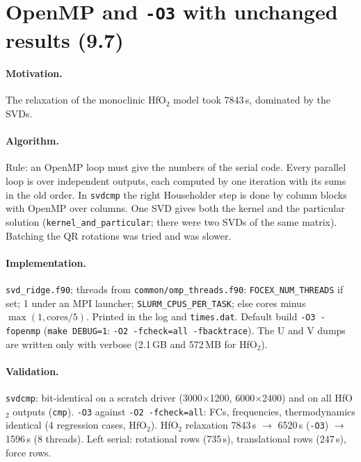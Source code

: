 \documentclass[11pt,a4paper]{article}
\newcommand{\code}[1]{\texttt{#1}}
\begin{document}
\section{\texorpdfstring{OpenMP and \code{-O3} with unchanged results (9.7)}{OpenMP and -O3 with unchanged results (9.7)}}
\paragraph{Motivation.} The relaxation of the monoclinic HfO$_2$ model took 7843\,s, dominated by the SVDs.

\paragraph{Algorithm.} Rule: an OpenMP loop must give the numbers of the serial code. Every parallel loop is
over independent outputs, each computed by one iteration with its sums in the old order. In \code{svdcmp}
the right Householder step is done by column blocks with OpenMP over columns. One SVD gives both the kernel
and the particular solution (\code{kernel\_and\_particular}; there were two SVDs of the same matrix). Batching
the QR rotations was tried and was slower.

\paragraph{Implementation.} \code{svd\_ridge.f90}; threads from \code{common/omp\_threads.f90}:
\code{FOCEX\_NUM\_THREADS} if set; 1 under an MPI launcher; \code{SLURM\_CPUS\_PER\_TASK}; else cores minus
$\max(1,\text{cores}/5)$. Printed in the log and \code{times.dat}. Default build \code{-O3 -fopenmp}
(\code{make DEBUG=1}: \code{-O2 -fcheck=all -fbacktrace}). The U and V dumps are written only with verbose
(2.1\,GB and 572\,MB for HfO$_2$).

\paragraph{Validation.} \code{svdcmp}: bit-identical on a scratch driver (3000$\times$1200, 6000$\times$2400) and on all
HfO$_2$ outputs (\code{cmp}). \code{-O3} against \code{-O2 -fcheck=all}: FCs, frequencies, thermodynamics identical
(4 regression cases, HfO$_2$). HfO$_2$ relaxation 7843\,s $\to$ 6520\,s (\code{-O3}) $\to$ 1596\,s (8 threads). Left
serial: rotational rows (735\,s), translational rows (247\,s), force rows.
\end{document}
